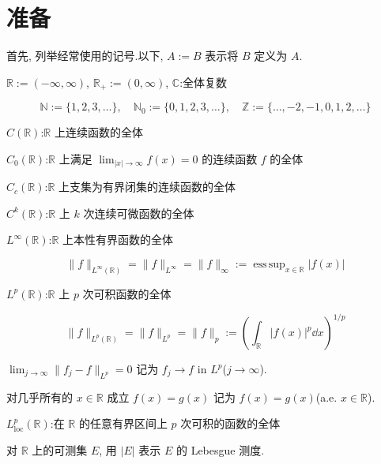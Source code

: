 \section{准备}\label{sec:1.1}


首先, 列举经常使用的记号.以下, $A := B$ 表示将 $B$ 定义为 $A$.

$\mathbb{R} := (-\infty, \infty)$, $\mathbb{R}_{+} := (0, \infty)$, $\mathbb{C}$:全体复数

\begin{equation*}
\mathbb{N} := \{1, 2, 3, \dots \}, \quad
\mathbb{N}_{0} := \{0, 1, 2, 3, \dots \}, \quad
\mathbb{Z} := \{\dots, -2, -1, 0, 1, 2, \dots \}
\end{equation*}

$C(\mathbb{R})$:$\mathbb{R}$ 上连续函数的全体

$C_0(\mathbb{R})$:$\mathbb{R}$ 上满足 $\lim_{|x|\to\infty}f(x) = 0$ 的连续函数 $f$ 的全体

$C_{c}(\mathbb{R})$:$\mathbb{R}$ 上支集为有界闭集的连续函数的全体

$C^{k}(\mathbb{R})$:$\mathbb{R}$ 上 $k$ 次连续可微函数的全体

$L^{\infty}(\mathbb{R})$:$\mathbb{R}$ 上本性有界函数的全体

\begin{equation*}
\| f \|_{L^{\infty}(\mathbb{R})} = \| f \|_{L^{\infty}} = \| f \|_{\infty} := \operatorname{ess\,sup}_{x \in \mathbb{R}} |f(x)|
\end{equation*}

$L^{p}(\mathbb{R})$:$\mathbb{R}$ 上 $p$ 次可积函数的全体

\begin{equation*}
\| f \|_{L^{p}(\mathbb{R})} = \| f \|_{L^{p}} = \| f \|_{p} := \left(\int_{\mathbb{R}} |f(x)|^{p}\dd x\right)^{1/p}
\end{equation*}

$\lim_{j\to\infty}\|f_{j}-f\|_{L^{p}} = 0$ 记为 $f_{j}\to f$ in $L^{p}$($j\to\infty$).

对几乎所有的 $x \in \mathbb{R}$ 成立 $f(x) = g(x)$ 记为
$f(x) = g(x)$(a.e. $x\in\mathbb{R}$).

$L_{\mathrm{loc}}^{p}(\mathbb{R})$:在 $\mathbb{R}$ 的任意有界区间上 $p$ 次可积的函数的全体

对 $\mathbb{R}$ 上的可测集 $E$, 用 $|E|$ 表示 $E$ 的 Lebesgue 测度.


